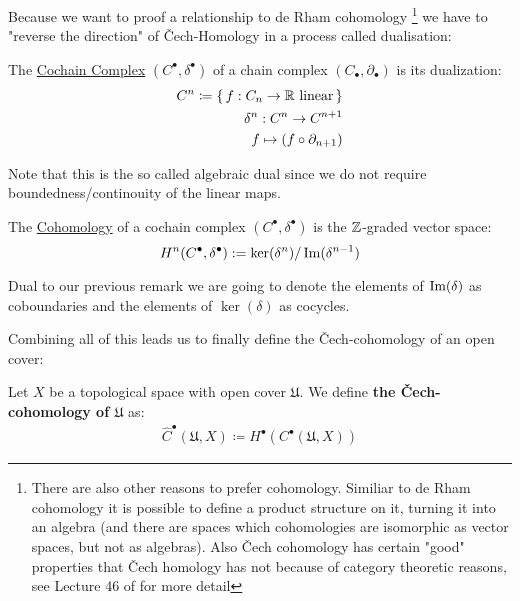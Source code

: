 Because we want to proof a relationship to de Rham cohomology \footnote{
	There are also other reasons to prefer cohomology. Similiar to de Rham
	cohomology it is possible to define a product structure on it, turning
	it into an algebra (and
	there are spaces which cohomologies are isomorphic as vector spaces,
	but not as algebras). Also Čech cohomology has certain "good" properties
	that Čech homology has not because of category theoretic reasons, see
	Lecture 46 of \cite{wendl_topology_2024} for more detail
 }
we have to "reverse the direction" of Čech-Homology in a process called
dualisation:
\begin{definition}
The \underline{Cochain Complex} $(C^\bullet, \delta^\bullet)$ of a 
chain complex $(C_\bullet, \partial_\bullet)$ is its dualization:
\begin{align}
	C^n \coloneq \{\, f: C_n \to \mathbb{R} \text{ linear}  \,\}\\
	\delta^n: C^n \to C^{n + 1} \\
	f \mapsto (f \circ \partial_{n + 1})
\end{align}
\end{definition}
\begin{remark}
Note that this is the so called algebraic dual since we do not require
boundedness/continouity of the linear maps.
\end{remark}
\begin{definition}
The \underline{Cohomology} of a cochain complex
$(C^\bullet, \delta^\bullet)$ is the $\mathbb{Z}$-graded vector space:
\[
	H^n(C^\bullet, \delta^\bullet) := \ker(\delta^n)/\operatorname{Im}(\delta^{n - 1})
\]
\end{definition}
Dual to our previous remark we are going to denote the elements of $\operatorname{Im}(\delta)$ as coboundaries
and the elements of $\ker(\delta)$ as cocycles.

Combining all of this leads us to finally define the Čech-cohomology of an open cover:
\begin{definition}
Let $X$ be a topological space with open cover $\mathfrak{U}$. We define \textbf{the Čech-cohomology of
$\mathfrak{U}$} as:
\begin{align*}
	\hat{C}^\bullet(\mathfrak{U}, X) \coloneqq H^\bullet(C^\bullet(\mathfrak{U}, X))
\end{align*}
\end{definition}


